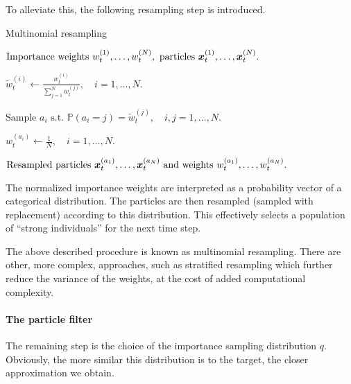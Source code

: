 To alleviate this, the following resampling step is introduced.
\begin{algorithm}[ht]
    \caption{Multinomial resampling}
    \label{alg:resampling}
    \begin{algorithmic}[1]
        \Input $\text{Importance weights } w_t^{(1)}, \ldots, w_t^{(N)},\ \text{particles } \bm{x}_t^{(1)}, \ldots, \bm{x}_t^{(N)}.$
        
        \State $\widetilde{w}_t^{(i)} \gets \frac{w_t^{(i)}}{\sum_{j=1}^N w_t^{(j)}}, \quad i = 1, \ldots, N.$ 
        
        \State $\text{Sample } a_i \text{ s.t. } \mathbb{P}(a_i = j) = \widetilde{w}_t^{(j)}, \quad i,j = 1, \ldots, N.$ 
        
        \State $w_t^{(a_i)} \gets \frac{1}{N}, \quad i = 1, \ldots, N.$ 
        
        \Output $\text{Resampled particles } \bm{x}_t^{(a_1)}, \ldots, \bm{x}_t^{(a_N)} \text{ and weights } w_t^{(a_1)}, \ldots, w_t^{(a_N)}.$
    \end{algorithmic}
\end{algorithm}

The normalized importance weights are interpreted as a probability vector of a categorical distribution. The particles are then resampled (sampled with replacement) according to this distribution. This effectively selects a population of ``strong individuals'' for the next time step.

The above described procedure is known as multinomial resampling. There are other, more complex, approaches, such as stratified resampling \citep{resampling} which further reduce the variance of the weights, at the cost of added computational complexity.

\paragraph{The particle filter}
The remaining step is the choice of the importance sampling distribution $q$. Obviously, the more similar this distribution is to the target, the closer approximation we obtain.

